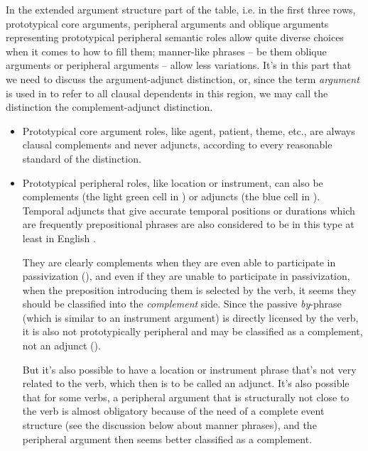 \documentclass[UTF8, a4paper, oneside, scheme=plain, 12pt]{ctexbook}
\newcommand*{\citesec}[1]{\S~{#1}}
\newcommand*{\term}[1]{\emph{#1}}
\newcommand{\form}[1]{\emph{#1}}
\begin{document}
In the extended argument structure part of the table, i.e. 
in the first three rows,
prototypical core arguments,
peripheral arguments and oblique arguments representing prototypical peripheral semantic roles 
allow quite diverse choices when it comes to how to fill them;
manner-like phrases -- be them oblique arguments or peripheral arguments -- 
allow less variations.
It's in this part that we need to discuss the argument-adjunct distinction, 
or, since the term \term{argument} is used in \citet{dixon2009basic1} to refer to 
all clausal dependents in this region, 
we may call the distinction the complement-adjunct distinction.
\begin{itemize}
    \item Prototypical core argument roles, 
    like agent, patient, theme, etc.,
    are always clausal complements and never adjuncts, 
    according to every reasonable standard of the distinction.
    \item Prototypical peripheral roles, like location or instrument, can also be complements 
    (the light green cell in )
    or adjuncts
    (the blue cell in ).
    Temporal adjuncts that give accurate temporal positions or durations 
    which are frequently prepositional phrases 
    are also considered to be in this type at least in English
    \citep[\citesec{1.5}]{cinque1999adverbs}. 

    They are clearly complements when they are even able to participate in passivization 
    (), 
    and even if they are unable to participate in passivization, 
    when the preposition introducing them is selected by the verb, 
    it seems they should be classified into the \term{complement} side.
    Since the passive \form{by}-phrase (which is similar to an instrument argument) 
    is directly licensed by the verb,
    it is also not prototypically peripheral and may be classified as a complement, not an adjunct
    ().

    But it's also possible to have a location or instrument phrase that's not very related to the verb, 
    which then is to be called an adjunct.
    It's also possible that for some verbs, 
    a peripheral argument that is structurally not close to the verb 
    is almost obligatory because of the need of a complete event structure 
    (see the discussion below about manner phrases), 
    and the peripheral argument then seems better classified as a complement. 


\end{itemize}
\end{document}
